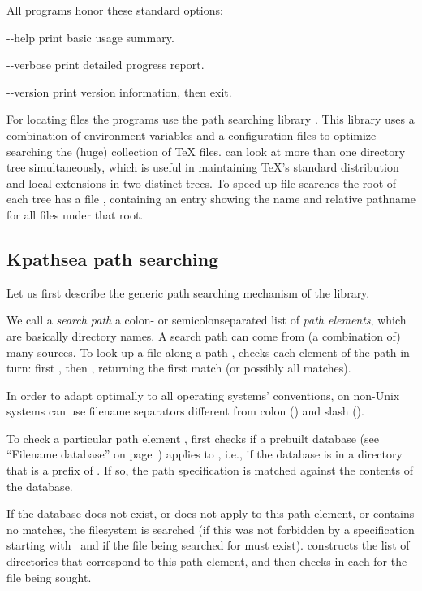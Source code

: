 \documentclass{article}
\begin{document}
All programs honor these standard  options:
\begin{ttdescription}
\item[-{}-help] print basic usage summary.
\item[-{}-verbose] print detailed progress report.
\item[-{}-version] print version information, then exit.
\end{ttdescription}

For locating files the \Webc{} programs use the path searching library
\KPS{}. This library uses a combination of environment variables and a
configuration files to optimize searching the (huge) collection of
\TeX{} files.  \Webc{} can look at more than one directory tree
simultaneously, which is useful in maintaining \TeX's standard
distribution and local extensions in two distinct trees. To speed up
file searches the root of each tree has a file , containing
an entry showing the name and relative pathname for all files under that
root.

\subsection{Kpathsea path searching}

Let us first describe the generic path searching mechanism of the \KPS{}
library. 

We call a \emph{search path} a colon- or semicolon\hyph sepa\-rated list
of \emph{path elements}, which are basically directory names.  A
search path can come from (a combination of) many sources.  To look up
a file  along a path , \KPS{} checks each
element of the path in turn: first , then
, returning the first match (or possibly all
matches).

In order to adapt optimally to all operating systems' conventions, on
non-Unix systems \KPS{} can use filename separators different from
colon (\samp{:}) and slash (\samp{/}).

To check a particular path element , \KPS{} first checks if a
prebuilt database (see ``Filename data\-base'' on 
page~\pageref{Filename-database}) applies to , i.e., if the database
is in a directory that is a prefix of .  If so, the path
specification is matched against the contents of the database.

If the database does not exist, or does not apply to this path
element, or contains no matches, the filesystem is searched (if this
was not forbidden by a specification starting with \samp{!!}\ and if
the file being searched for must exist).  \KPS{} constructs the list
of directories that correspond to this path element, and then checks
in each for the file being sought.
\end{document}
